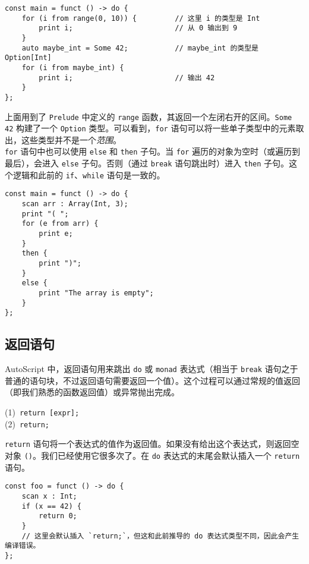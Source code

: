 \begin{lstlisting}
const main = funct () -> do {
    for (i from range(0, 10)) {			// 这里 i 的类型是 Int
        print i;                        // 从 0 输出到 9
    }
    auto maybe_int = Some 42;			// maybe_int 的类型是 Option[Int]
    for (i from maybe_int) {
        print i;                        // 输出 42
    }
};
\end{lstlisting}

上面用到了 \lstinline!Prelude! 中定义的 \lstinline!range! 函数，其返回一个左闭右开的区间。\lstinline!Some 42! 构建了一个 \lstinline!Option! 类型。可以看到，\lstinline!for! 语句可以将一些单子类型中的元素取出，这些类型并不是一个\emph{范围}。 \\

\lstinline!for! 语句中也可以使用 \lstinline!else! 和 \lstinline!then! 子句。当 \lstinline!for! 遍历的对象为空时（或遍历到最后），会进入 \lstinline!else! 子句。否则（通过 \lstinline!break! 语句跳出时）进入 \lstinline!then! 子句。这个逻辑和此前的 \lstinline!if!、\lstinline!while! 语句是一致的。

\begin{lstlisting}
const main = funct () -> do {
	scan arr : Array(Int, 3);
	print "( ";
    for (e from arr) {
        print e;
    }
    then {
    	print ")";
    }
    else {
        print "The array is empty";
    }
};
\end{lstlisting}

\subsection{返回语句}

AutoScript 中，返回语句用来跳出 \lstinline!do! 或 \lstinline!monad! 表达式（相当于 \lstinline!break! 语句之于普通的语句块，不过返回语句需要返回一个值）。这个过程可以通过常规的值返回（即我们熟悉的函数返回值）或异常抛出完成。

\begin{grammar} \label{grm:return-statement}
    (1)\ \lstinline!return [expr];! \\
    (2)\ \lstinline!return;!
\end{grammar}

\lstinline!return! 语句将一个表达式的值作为返回值。如果没有给出这个表达式，则返回空对象 \lstinline!()!。我们已经使用它很多次了。在 \lstinline!do! 表达式的末尾会默认插入一个 \lstinline!return! 语句。

\begin{lstlisting}
const foo = funct () -> do {
	scan x : Int;
	if (x == 42) {
		return 0;
	}
	// 这里会默认插入 `return;`，但这和此前推导的 do 表达式类型不同，因此会产生编译错误。
};
\end{lstlisting}

